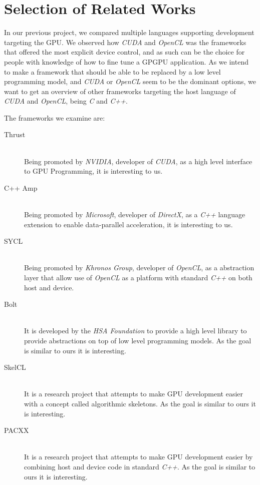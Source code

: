 
\section{Selection of Related Works}
In our previous project, we compared multiple languages supporting development targeting the GPU\cite{sw9Report}. We observed how \textit{CUDA} and \textit{OpenCL} was the frameworks that offered the most explicit device control, and as such can be the choice for people with knowledge of how to fine tune a GPGPU application. As we intend to make a framework that should be able to be replaced by a low level programming model, and \textit{CUDA} or \textit{OpenCL} seem to be the dominant options, we want to get an overview of other frameworks targeting the host language of \textit{CUDA} and \textit{OpenCL}, being \textit{C} and \textit{C++}.

The frameworks we examine are:
\begin{description}
\item[Thrust] \hfill \\
Being promoted by \textit{NVIDIA}, developer of \textit{CUDA}, as a high level interface to GPU Programming, it is interesting to us\cite{thrustNvidia}.
\item[C++ Amp] \hfill \\
Being promoted by \textit{Microsoft}, developer of \textit{DirectX}, as a \textit{C++} language extension to enable data-parallel acceleration, it is interesting to us\cite{microsoftCppAMP}.
\item[SYCL] \hfill \\
Being promoted by \textit{Khronos Group}, developer of \textit{OpenCL}, as a abstraction layer that allow use of \textit{OpenCL} as a platform with standard \textit{C++} on both host and device\cite{khronosSYCL}.
\item[Bolt] \hfill \\
It is developed by the \textit{HSA Foundation} to provide a high level library to provide abstractions on top of low level programming models. As the goal is similar to ours it is interesting\cite{boltDoc}.
\item[SkelCL] \hfill \\
It is a research project that attempts to make GPU development easier with a concept called algorithmic skeletons. As the goal is similar to ours it is interesting\cite{skelclPaper}.
\item[PACXX] \hfill \\
It is a research project that attempts to make GPU development easier by combining host and device code in standard \textit{C++}. As the goal is similar to ours it is interesting\cite{pacxxPaper}.
\end{description}

